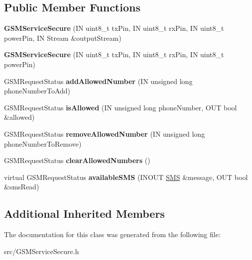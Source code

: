 \subsection*{Public Member Functions}
\begin{DoxyCompactItemize}
\item 
\mbox{\label{class_easyuino_1_1_g_s_m_service_secure_ab28bad6e7765f61851a3957edc5d3071}} 
{\bfseries G\+S\+M\+Service\+Secure} (IN uint8\+\_\+t tx\+Pin, IN uint8\+\_\+t rx\+Pin, IN uint8\+\_\+t power\+Pin, IN Stream \&output\+Stream)
\item 
\mbox{\label{class_easyuino_1_1_g_s_m_service_secure_a4331122e2c6e42711eb13bf59cfd940c}} 
{\bfseries G\+S\+M\+Service\+Secure} (IN uint8\+\_\+t tx\+Pin, IN uint8\+\_\+t rx\+Pin, IN uint8\+\_\+t power\+Pin)
\item 
\mbox{\label{class_easyuino_1_1_g_s_m_service_secure_a7acbf1d460ef1b81bcd36d852b596af3}} 
G\+S\+M\+Request\+Status {\bfseries add\+Allowed\+Number} (IN unsigned long phone\+Number\+To\+Add)
\item 
\mbox{\label{class_easyuino_1_1_g_s_m_service_secure_a791dd872fe2c72311d84219616e5f54c}} 
G\+S\+M\+Request\+Status {\bfseries is\+Allowed} (IN unsigned long phone\+Number, O\+UT bool \&allowed)
\item 
\mbox{\label{class_easyuino_1_1_g_s_m_service_secure_a1ad4988fa2dcc0ba8f87c70cf71edf29}} 
G\+S\+M\+Request\+Status {\bfseries remove\+Allowed\+Number} (IN unsigned long phone\+Number\+To\+Remove)
\item 
\mbox{\label{class_easyuino_1_1_g_s_m_service_secure_a10a8160dfb473d84b4bd182d689bdb95}} 
G\+S\+M\+Request\+Status {\bfseries clear\+Allowed\+Numbers} ()
\item 
\mbox{\label{class_easyuino_1_1_g_s_m_service_secure_a6c64fcfd9f98bec206543bc1699623d7}} 
virtual G\+S\+M\+Request\+Status {\bfseries available\+S\+MS} (I\+N\+O\+UT \hyperlink{class_easyuino_1_1_s_m_s}{S\+MS} \&message, O\+UT bool \&sms\+Read)
\end{DoxyCompactItemize}
\subsection*{Additional Inherited Members}


The documentation for this class was generated from the following file\+:\begin{DoxyCompactItemize}
\item 
src/G\+S\+M\+Service\+Secure.\+h\end{DoxyCompactItemize}
